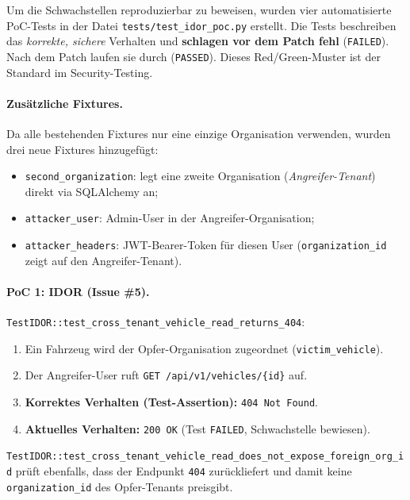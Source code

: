 Um die Schwachstellen reproduzierbar zu beweisen, wurden vier automatisierte
PoC-Tests in der Datei \texttt{tests/test\_idor\_poc.py} erstellt.
Die Tests beschreiben das \emph{korrekte, sichere} Verhalten und
\textbf{schlagen vor dem Patch fehl} (\texttt{FAILED}).
Nach dem Patch laufen sie durch (\texttt{PASSED}).
Dieses Red/Green-Muster ist der Standard im Security-Testing.

\paragraph{Zusätzliche Fixtures.}
Da alle bestehenden Fixtures nur eine einzige Organisation verwenden, wurden drei
neue Fixtures hinzugefügt:
\begin{itemize}
    \item \texttt{second\_organization}: legt eine zweite Organisation
          (\emph{Angreifer-Tenant}) direkt via SQLAlchemy an;
    \item \texttt{attacker\_user}: Admin-User in der Angreifer-Organisation;
    \item \texttt{attacker\_headers}: JWT-Bearer-Token für diesen User
          (\texttt{organization\_id} zeigt auf den Angreifer-Tenant).
\end{itemize}

\paragraph{PoC 1: IDOR (Issue \#5).}
\texttt{TestIDOR::test\_cross\_tenant\_vehicle\_read\_returns\_404}:
\begin{enumerate}
    \item Ein Fahrzeug wird der Opfer-Organisation zugeordnet (\texttt{victim\_vehicle}).
    \item Der Angreifer-User ruft \texttt{GET /api/v1/vehicles/\{id\}} auf.
    \item \textbf{Korrektes Verhalten (Test-Assertion):} \texttt{404 Not Found}.
    \item \textbf{Aktuelles Verhalten:} \texttt{200 OK} (Test \texttt{FAILED},
          Schwachstelle bewiesen).
\end{enumerate}

\texttt{TestIDOR::test\_cross\_tenant\_vehicle\_read\_does\_not\_expose\_foreign\_org\_id}
prüft ebenfalls, dass der Endpunkt \texttt{404} zurückliefert und damit keine
\texttt{organization\_id} des Opfer-Tenants preisgibt.

